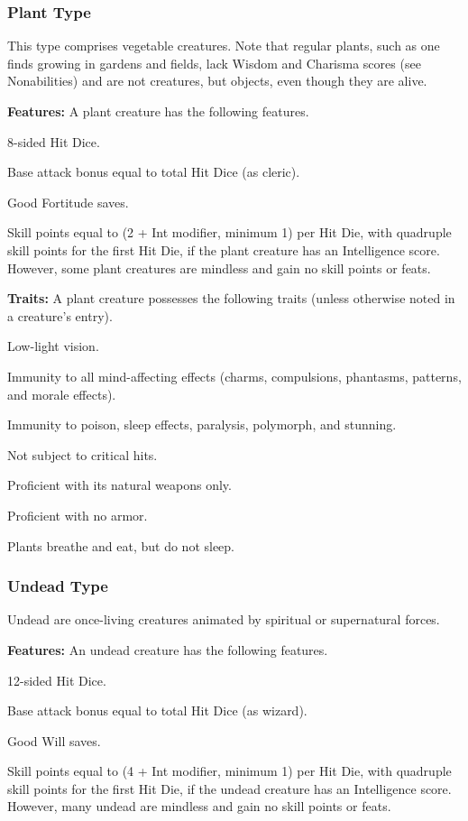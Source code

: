 \subsubsection{Plant Type}
This type comprises vegetable creatures. Note that regular plants, such as one finds growing in gardens and fields, lack Wisdom and Charisma scores (see Nonabilities) and are not creatures, but objects, even though they are alive.

\textbf{Features:} A plant creature has the following features.
\begin{itemize*}
\item 8-sided Hit Dice.
\item Base attack bonus equal to \threequarters total Hit Dice (as cleric).
\item Good Fortitude saves.
\item Skill points equal to (2 + Int modifier, minimum 1) per Hit Die, with quadruple skill points for the first Hit Die, if the plant creature has an Intelligence score. However, some plant creatures are mindless and gain no skill points or feats.
\end{itemize*}

\textbf{Traits:} A plant creature possesses the following traits (unless otherwise noted in a creature's entry).
\begin{itemize*}
\item Low-light vision.
\item Immunity to all mind-affecting effects (charms, compulsions, phantasms, patterns, and morale effects).
\item Immunity to poison, sleep effects, paralysis, polymorph, and stunning.
\item Not subject to critical hits.
\item Proficient with its natural weapons only.
\item Proficient with no armor.
\item Plants breathe and eat, but do not sleep.
\end{itemize*}

\subsubsection{Undead Type}
Undead are once-living creatures animated by spiritual or supernatural forces.

\textbf{Features:} An undead creature has the following features.
\begin{itemize*}
\item 12-sided Hit Dice.
\item Base attack bonus equal to \onehalf total Hit Dice (as wizard).
\item Good Will saves.
\item Skill points equal to (4 + Int modifier, minimum 1) per Hit Die, with quadruple skill points for the first Hit Die, if the undead creature has an Intelligence score. However, many undead are mindless and gain no skill points or feats.
\end{itemize*}

